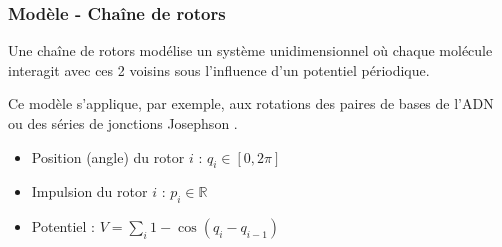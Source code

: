 \begin{frame}

    \frametitle{Modèle - Chaîne de rotors}

    Une chaîne de rotors modélise un système unidimensionnel où chaque molécule
    interagit avec ces 2 voisins sous l'influence d'un potentiel périodique.

    Ce modèle s'applique, par exemple, aux rotations des paires de bases de
    l'ADN ou des séries de jonctions Josephson \cite{TAKENO1996140}.

    \begin{itemize}
        \item Position (angle) du rotor $i$ : $q_i \in [0, 2\pi]$
        \item Impulsion du rotor $i$ : $p_i \in \mathbb{R}$
        \item Potentiel : $V = \sum_i 1 - \cos(q_i - q_{i-1})$
    \end{itemize}

\end{frame}

























